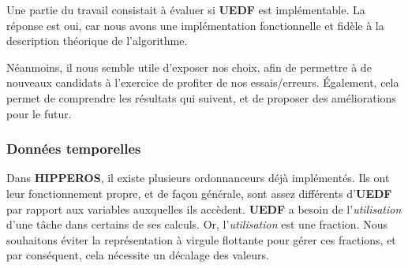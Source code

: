 
	Une partie du travail consistait à évaluer si \textbf{UEDF} est implémentable. 
	La réponse est oui, car nous avons une implémentation fonctionnelle et fidèle à la description 
	théorique de l'algorithme. \newline
	
	Néanmoins, il nous semble utile d'exposer nos choix, afin de permettre à de nouveaux candidats 
	à l'exercice de profiter de nos essais/erreurs. Également, cela permet de comprendre les 
	résultats qui suivent, et de proposer des améliorations pour le futur.

	\subsubsection{Données temporelles}
	
		Dans \textbf{HIPPEROS}, il existe plusieurs ordonnanceurs déjà implémentés. 
		Ils ont leur fonctionnement propre, et de façon générale, sont assez différents d'\textbf{UEDF} par 
		rapport aux variables auxquelles ils accèdent. 
		\textbf{UEDF} a besoin de l'\textit{utilisation} d'une tâche dans certains de ses calculs. Or, l'\textit{utilisation} 
		est une fraction. Nous souhaitons éviter la représentation à virgule flottante 
		pour gérer ces fractions, et par conséquent, cela nécessite un décalage des valeurs.\newline
		 
